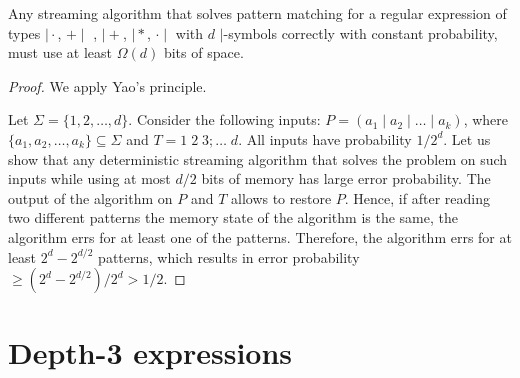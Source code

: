 \documentclass{article}
\begin{document}
\begin{lemma}
Any streaming algorithm that solves pattern matching for a regular expression of types $\mid \cdot$, $+ \mid$ , $\mid +$, $\mid *$, $\cdot \mid$ with $d$ $\mid$-symbols correctly with constant probability, must use at least $\Omega(d)$ bits of space.
\end{lemma}
\begin{proof}
We apply Yao's principle. 

Let $\Sigma = \{1, 2, \ldots, d\}$. Consider the following inputs: $P = (a_1 \mid a_2 \mid \ldots \mid a_k)$, where $\{a_1, a_2, \ldots, a_k\} \subseteq \Sigma$ and $T = 1 \; 2 \; 3; \ldots \; d$. All inputs have probability $1/2^d$. Let us show that any deterministic streaming algorithm that solves the problem on such inputs while using at most $d/2$ bits of memory has large error probability. The output of the algorithm on $P$ and $T$ allows to restore $P$. Hence, if after reading two different patterns the memory state of the algorithm is the same, the algorithm errs for at least one of the patterns. Therefore, the algorithm errs for at least $2^d - 2^{d/2}$ patterns, which results in error probability $\ge (2^d - 2^{d/2}) / 2^d > 1/2$. 
\end{proof}


\section{Depth-3 expressions}
\end{document}
